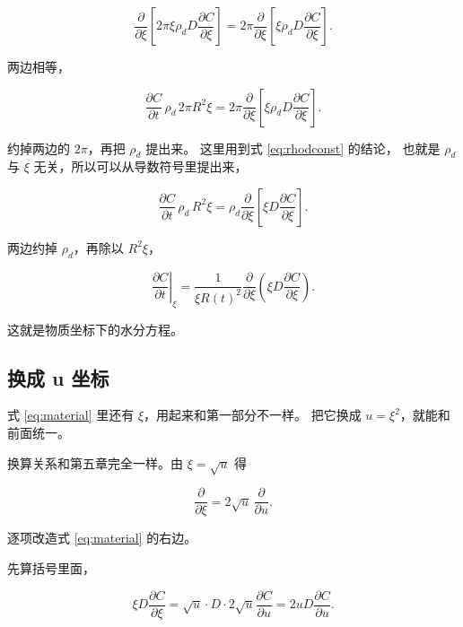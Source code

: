 \begin{equation}
\frac{\partial}{\partial \xi}\left[2\pi\xi\rho_d D\frac{\partial C}{\partial \xi}\right]
= 2\pi\frac{\partial}{\partial \xi}\left[\xi\rho_d D\frac{\partial C}{\partial \xi}\right] .
\end{equation}

两边相等，

\begin{equation}
\frac{\partial C}{\partial t}\,\rho_d\,2\pi R^2\xi
= 2\pi\frac{\partial}{\partial \xi}\left[\xi\rho_d D\frac{\partial C}{\partial \xi}\right] .
\end{equation}

约掉两边的 $2\pi$，再把 $\rho_d$ 提出来。
这里用到式 \eqref{eq:rhodconst} 的结论，
也就是 $\rho_d$ 与 $\xi$ 无关，所以可以从导数符号里提出来，

\begin{equation}
\frac{\partial C}{\partial t}\,\rho_d\,R^2\xi
= \rho_d\frac{\partial}{\partial \xi}\left[\xi D\frac{\partial C}{\partial \xi}\right] .
\end{equation}

两边约掉 $\rho_d$，再除以 $R^2\xi$，

\begin{equation}
\boxed{\;
\left.\frac{\partial C}{\partial t}\right|_\xi
= \frac{1}{\xi R(t)^2}\frac{\partial}{\partial \xi}\left(\xi D\frac{\partial C}{\partial \xi}\right).
\;}
\label{eq:material}
\end{equation}

这就是物质坐标下的水分方程。

\subsection{换成 u 坐标}

式 \eqref{eq:material} 里还有 $\xi$，用起来和第一部分不一样。
把它换成 $u=\xi^2$，就能和前面统一。

换算关系和第五章完全一样。由 $\xi=\sqrt{u}$ 得

\begin{equation}
\frac{\partial}{\partial \xi} = 2\sqrt{u}\,\frac{\partial}{\partial u}.
\end{equation}

逐项改造式 \eqref{eq:material} 的右边。

先算括号里面，

\begin{equation}
\xi D\frac{\partial C}{\partial \xi}
= \sqrt{u}\cdot D\cdot 2\sqrt{u}\frac{\partial C}{\partial u}
= 2uD\frac{\partial C}{\partial u}.
\end{equation}

